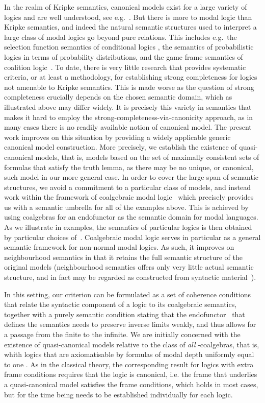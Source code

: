 \documentclass[proceedings]{stacs}
\theoremstyle{definition}
\theoremstyle{plain}
\begin{document}
In the realm of Kripke semantics, canonical models exist for a large
variety of logics and are well understood, see e.g.\
\cite{BlackburnEA01}. But there is more to modal logic than Kripke
semantics, and indeed the natural semantic structures used to
interpret a  large
class of modal logics go beyond pure relations. This includes e.g.\
the selection function semantics of conditional logics
\cite{Chellas80}, the semantics of probabilistic logics in terms of
probability distributions, and the game frame semantics of coalition 
logic~\cite{Pauly02}.  
To date, there is very little research that provides systematic
criteria, or at least a methodology, for establishing strong
completeness for logics not amenable to Kripke semantics.  This is made worse
as the question of strong completeness crucially depends on the chosen
semantic domain, which as illustrated above may differ widely. It is
precisely this variety in semantics that makes it hard to employ the
strong-completeness-via-canonicity approach, as in many cases there is
no readily available notion of canonical model.  The present work
improves on this situation by providing a widely applicable generic
canonical model construction. More precisely,  we establish the
existence of quasi-canonical models, that is, models based on the
set of maximally consistent sets of formulas that satisfy the truth
lemma, as there may be no unique, or canonical, such model in our
more general case.
In order to cover the large span of semantic structures, we avoid a
commitment to a particular class of models, and instead work within
the framework of coalgebraic modal logic~\cite{Pattinson03} which
precisely provides us with a semantic umbrella for all of the examples
above.  This is achieved by using coalgebras for an endofunctor  as
the semantic domain for modal languages. As we illustrate in examples,
the semantics of particular logics is then obtained by particular
choices of~. Coalgebraic modal logic serves in particular as a
general semantic framework for non-normal modal
logics. As such, it improves on neighbourhood semantics in that it
retains the full semantic structure of the original models
(neighbourhood semantics offers only very little actual semantic
structure, and in fact may be regarded as constructed from syntactic
material~\cite{SchroderPattinson07mcs}).



In this setting, our criterion can be formulated as a set of coherence
conditions that relate the syntactic component of a logic to its
coalgebraic semantics, together with a purely semantic condition
stating that the endofunctor~ that defines the semantics needs to
preserve inverse limits weakly, and thus allows for a passage from the
finite to the infinite. We are initially concerned with the existence
of quasi-canonical models relative to the class of \emph{all}
-coalgebras, that is, whith logics that are axiomatisable by
formulas of modal depth uniformly equal to one \cite{Schroder07}.  As
in the classical theory, the corresponding result for logics with
extra frame conditions requires that the logic is canonical, i.e. the
frame that underlies a quasi-canonical model satisfies the frame
conditions, which holds in most cases, but for the time being needs to
be established individually for each logic.
\end{document}
